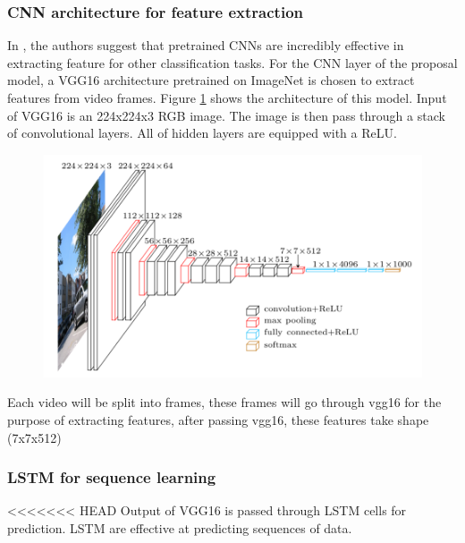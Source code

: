 \subsubsection{CNN architecture for feature extraction}
In \cite{DBLP:journals/corr/ZhouKLOT14}, the authors suggest that pretrained CNNs are incredibly effective in extracting feature for other classification tasks.
For the CNN layer of the proposal model, a VGG16 \cite{DBLP:journals/corr/SimonyanZ14a} architecture pretrained on ImageNet  is chosen to extract features from video frames. Figure \ref{chap3:vgg16_architecture} shows the architecture of this model. Input of VGG16 is an 224x224x3 RGB image. The image is then pass through a stack of convolutional layers. All of hidden layers are equipped with a ReLU.  
\begin{center}
    \begin{figure}[H]
    \centering
    \includegraphics[width=1\columnwidth]{images/chap3/vgg16_architecture.png}
    \footcaption{}
    \label{chap3:vgg16_architecture}
    \end{figure}
\end{center}

Each video will be split into frames, these frames will go through vgg16 for the purpose of extracting features, after passing vgg16, these features take shape (7x7x512)

\subsubsection{LSTM for sequence learning}
<<<<<<< HEAD
Output of VGG16 is passed through LSTM cells for prediction. LSTM are effective at predicting sequences of data. 
